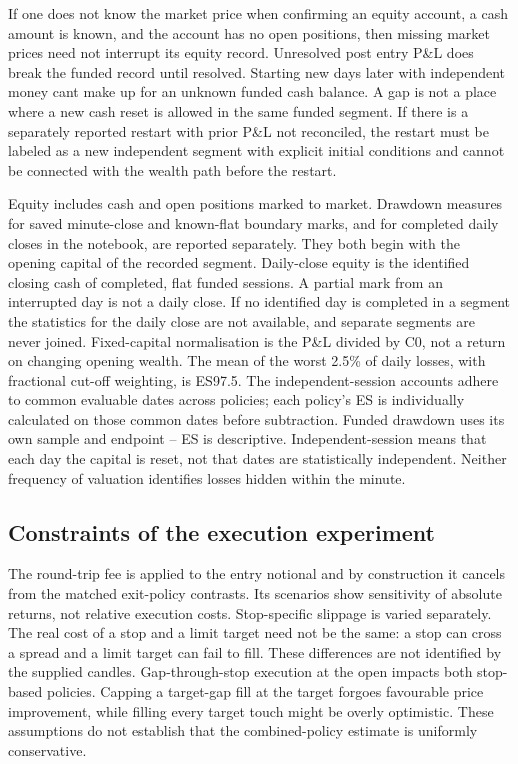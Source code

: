 \documentclass[11pt,a4paper]{article}
\begin{document}
If one does not know the market price when confirming an equity account, a cash amount is known, and the account has no open positions, then missing market prices need not interrupt its equity record. Unresolved post entry P\&L does break the funded record until resolved. Starting new days later with independent money cant make up for an unknown funded cash balance. A gap is not a place where a new cash reset is allowed in the same funded segment. If there is a separately reported restart with prior P\&L not reconciled, the restart must be labeled as a new independent segment with explicit initial conditions and cannot be connected with the wealth path before the restart.

Equity includes cash and open positions marked to market. Drawdown measures for saved minute-close and known-flat boundary marks, and for completed daily closes in the notebook, are reported separately. They both begin with the opening capital of the recorded segment. Daily-close equity is the identified closing cash of completed, flat funded sessions. A partial mark from an interrupted day is not a daily close. If no identified day is completed in a segment the statistics for the daily close are not available, and separate segments are never joined. Fixed-capital normalisation is the P\&L divided by C0, not a return on changing opening wealth. The mean of the worst 2.5\% of daily losses, with fractional cut-off weighting, is ES97.5. The independent-session accounts adhere to common evaluable dates across policies; each policy's ES is individually calculated on those common dates before subtraction. Funded drawdown uses its own sample and endpoint -- ES is descriptive. Independent-session means that each day the capital is reset, not that dates are statistically independent. Neither frequency of valuation identifies losses hidden within the minute.

\subsection*{Constraints of the execution experiment}

The round-trip fee is applied to the entry notional and by construction it cancels from the matched exit-policy contrasts. Its scenarios show sensitivity of absolute returns, not relative execution costs. Stop-specific slippage is varied separately. The real cost of a stop and a limit target need not be the same: a stop can cross a spread and a limit target can fail to fill. These differences are not identified by the supplied candles. Gap-through-stop execution at the open impacts both stop-based policies. Capping a target-gap fill at the target forgoes favourable price improvement, while filling every target touch might be overly optimistic. These assumptions do not establish that the combined-policy estimate is uniformly conservative.
\end{document}
